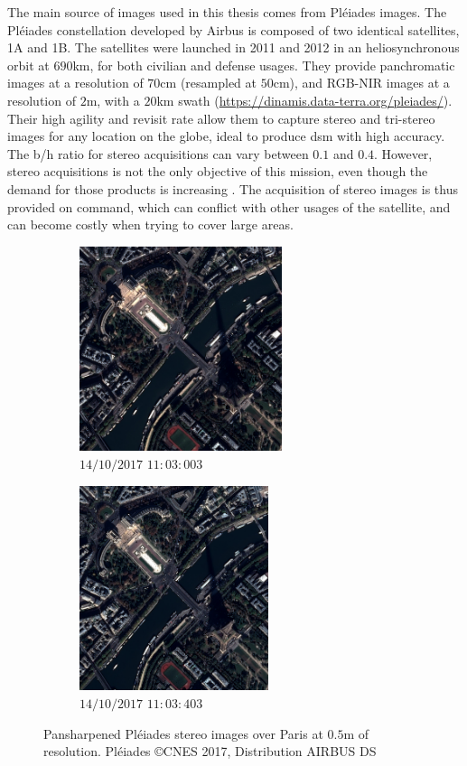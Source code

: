 The main source of images used in this thesis comes from Pléiades images. The Pléiades constellation developed by Airbus is composed of two identical satellites, 1A and 1B. The satellites were launched in 2011 and 2012 in an heliosynchronous orbit at $690$km, for both civilian and defense usages. They provide panchromatic images at a resolution of $70$cm (resampled at $50$cm), and RGB-NIR images at a resolution of $2$m, with a $20$km swath (\url{https://dinamis.data-terra.org/pleiades/}). Their high agility and revisit rate allow them to capture stereo and tri-stereo images for any location on the globe, ideal to produce \acrshort{dsm} with high accuracy. The \acrshort{b/h} ratio for stereo acquisitions can vary between $0.1$ and $0.4$. However, stereo acquisitions is not the only objective of this mission, even though the demand for those products is increasing \cite{berthier_glacier_2014, poli_radiometric_2015, rieg_pleiades_2018, loghin_potential_2020}. The acquisition of stereo images is thus provided on command, which can conflict with other usages of the satellite, and can become costly when trying to cover large areas.  
\begin{figure}
    \centering
    \begin{subfigure}{0.5\linewidth}
        \centering
        \includegraphics[height=6cm]{Images/Paris_003.jpeg}
        \caption{$14/10/2017$ $11:03:003$}
        \label{fig:Pleiade_over_Paris_a}
    \end{subfigure}\hfill
    \begin{subfigure}{0.5\linewidth}
        \centering
        \includegraphics[height=6cm]{Images/Paris_403.jpeg}
        \caption{$14/10/2017$ $11:03:403$}
        \label{fig:Pleiade_over_Paris_b}
    \end{subfigure}
    \caption{Pansharpened Pléiades stereo images over Paris at $0.5$m of resolution. Pléiades \copyright CNES 2017, Distribution AIRBUS DS}
    \label{fig:Pleiade_over_Paris}
\end{figure}

